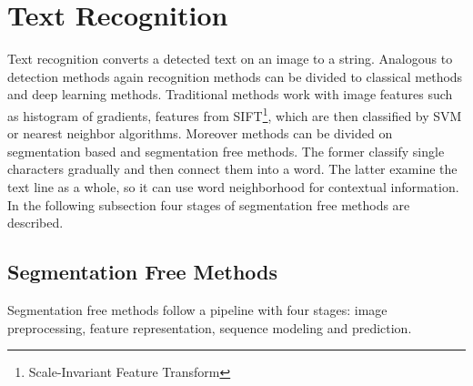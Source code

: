 \section{Text Recognition}

Text recognition converts a detected text on an image to a string. Analogous to detection methods again recognition methods can be divided to classical methods and deep learning methods. Traditional methods work with image features such as histogram of gradients, features from SIFT\footnote{Scale-Invariant Feature Transform}, which are then classified by SVM or nearest neighbor algorithms. Moreover methods can be divided on segmentation based and segmentation free methods. The former classify single characters gradually and then connect them into a word. The latter examine the text line as a whole, so it can use word neighborhood for contextual information. In the following subsection four stages of segmentation free methods are described.\cite{chen2021text,raisi2020text}

\subsection*{Segmentation Free Methods}

Segmentation free methods follow a pipeline with four stages: image preprocessing, feature representation, sequence modeling and prediction.

